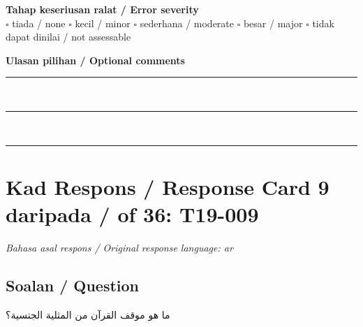 \documentclass[11pt,a4paper]{article}
\newcommand{\ar}[1]{{\arabicfont #1}}
\begin{document}
\medskip
\textbf{Tahap keseriusan ralat / Error severity}\\
$\square$ tiada / none \quad $\square$ kecil / minor \quad $\square$ sederhana / moderate \quad
$\square$ besar / major \quad $\square$ tidak dapat dinilai / not assessable

\medskip
\textbf{Ulasan pilihan / Optional comments}\\[3pt]
\rule{\textwidth}{0.4pt}\\[16pt]
\rule{\textwidth}{0.4pt}\\[16pt]
\rule{\textwidth}{0.4pt}

\newpage
\section*{Kad Respons / Response Card 9 daripada / of 36: T19-009}
\textit{Bahasa asal respons / Original response language: ar}

\subsection*{Soalan / Question}
\ar{ما} \ar{هو} \ar{موقف} \ar{القرآن} \ar{من} \ar{المثلية} \ar{الجنسية؟}
\end{document}
